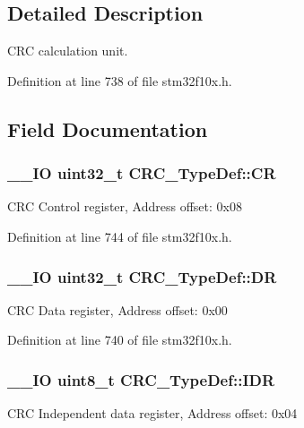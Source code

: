 \subsection{Detailed Description}
C\-R\-C calculation unit. 

Definition at line 738 of file stm32f10x.\-h.



\subsection{Field Documentation}
\hypertarget{struct_c_r_c___type_def_af33fa5c173e1c102e6d0242fe60e569f}{
\subsubsection[{C\-R}]{\setlength{\rightskip}{0pt plus 5cm}\-\_\-\-\_\-\-I\-O {\bf uint32\-\_\-t} C\-R\-C\-\_\-\-Type\-Def\-::\-C\-R}}\label{struct_c_r_c___type_def_af33fa5c173e1c102e6d0242fe60e569f}
C\-R\-C Control register, Address offset\-: 0x08 

Definition at line 744 of file stm32f10x.\-h.

\hypertarget{struct_c_r_c___type_def_a50cb22870dbb9001241cec694994e5ef}{
\subsubsection[{D\-R}]{\setlength{\rightskip}{0pt plus 5cm}\-\_\-\-\_\-\-I\-O {\bf uint32\-\_\-t} C\-R\-C\-\_\-\-Type\-Def\-::\-D\-R}}\label{struct_c_r_c___type_def_a50cb22870dbb9001241cec694994e5ef}
C\-R\-C Data register, Address offset\-: 0x00 

Definition at line 740 of file stm32f10x.\-h.

\hypertarget{struct_c_r_c___type_def_ad84e8694cd4b5375ee533c2d875c3b5a}{
\subsubsection[{I\-D\-R}]{\setlength{\rightskip}{0pt plus 5cm}\-\_\-\-\_\-\-I\-O {\bf uint8\-\_\-t} C\-R\-C\-\_\-\-Type\-Def\-::\-I\-D\-R}}\label{struct_c_r_c___type_def_ad84e8694cd4b5375ee533c2d875c3b5a}
C\-R\-C Independent data register, Address offset\-: 0x04 

